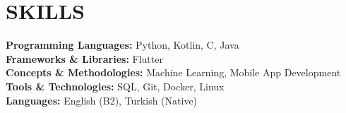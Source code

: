 \documentclass[11pt]{article}       %
\begin{document}
\vspace{-6.5pt}

\section*{SKILLS}
\textbf{Programming Languages:} Python, Kotlin, C, Java \\
\textbf{Frameworks \& Libraries:} Flutter \\
\textbf{Concepts \& Methodologies:}  Machine Learning, Mobile App Development \\
\textbf{Tools \& Technologies:} SQL, Git, Docker, Linux \\
\textbf{Languages:} English (B2), Turkish (Native)
\end{document}
